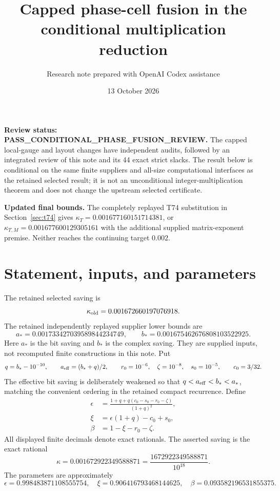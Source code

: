 \documentclass[11pt]{article}
\title{Capped phase-cell fusion in the conditional multiplication reduction}
\author{Research note prepared with OpenAI Codex assistance}
\date{13 October 2026}
\begin{document}
\maketitle

\noindent\textbf{Review status: PASS\_CONDITIONAL\_PHASE\_FUSION\_REVIEW.} The capped local-gauge and layout changes have independent audits, followed by an integrated review of this note and its 44 exact strict slacks. The result below is conditional on the same finite suppliers and all-size computational interfaces as the retained selected result; it is not an unconditional integer-multiplication theorem and does not change the upstream selected certificate.

\noindent\textbf{Updated final bounds.} The completely replayed T74 substitution in Section~\ref{sec:t74} gives $\kappa_T=0.001677160151714381$, or $\kappa_{T,M}=0.001677600129305161$ with the additional supplied matrix-exponent premise. Neither reaches the continuing target $0.002$.

\section{Statement, inputs, and parameters}

The retained selected saving is
\[
 \kappa_{\rm old}=0.001672660197076918.
\]
The retained independently replayed supplier lower bounds are
\[
 a_*=0.001733427039589844234749,\qquad
 b_*=0.001675462676808103522925.
\]
Here $a_*$ is the bit saving and $b_*$ is the complex saving. They are supplied inputs, not recomputed finite constructions in this note. Put
\[
 q=b_*-10^{-10},\qquad a_{\rm eff}=(b_*+q)/2,
 \qquad r_0=10^{-6},\quad \zeta=10^{-8},\quad s_0=10^{-5},
 \qquad c_0=3/32.
\]
The effective bit saving is deliberately weakened so that
$q<a_{\rm eff}<b_*<a_*$, matching the convenient ordering in the retained compact recurrence. Define
\begin{align}
 \epsilon&=\frac{1+q+q(c_0-s_0-r_0-\zeta)}{(1+q)^2},\\
 \xi&=\epsilon(1+q)-c_0+s_0,\\
 \beta&=1-\xi-r_0-\zeta.
\end{align}
All displayed finite decimals denote exact rationals. The asserted saving is the exact rational
\[
 \boxed{\kappa=0.001672922349588871
       =\frac{1672922349588871}{10^{18}}.}
\]
The parameters are approximately
\[
 \epsilon=0.998483871108555754,\quad
 \xi=0.906416793468144625,\quad
 \beta=0.093582196531855375.
\]
\end{document}
